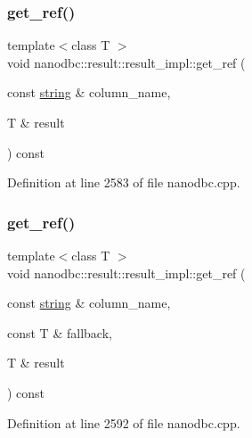 \subsubsection{\texorpdfstring{get\_ref()}{get\_ref()}\hspace{0.1cm}{\footnotesize\ttfamily [3/4]}}
{\footnotesize\ttfamily template$<$class T $>$ \\
void nanodbc\+::result\+::result\+\_\+impl\+::get\+\_\+ref (\begin{DoxyParamCaption}\item[{const \mbox{\hyperlink{namespacenanodbc_abfc0ece56278e590911ec8352774c212}{string}} \&}]{column\+\_\+name,  }\item[{T \&}]{result }\end{DoxyParamCaption}) const\hspace{0.3cm}{\ttfamily [inline]}}



Definition at line 2583 of file nanodbc.\+cpp.

\mbox{\label{classnanodbc_1_1result_1_1result__impl_a1a35ae37c9f6059277186f934b09cf12}} 
\subsubsection{\texorpdfstring{get\_ref()}{get\_ref()}\hspace{0.1cm}{\footnotesize\ttfamily [4/4]}}
{\footnotesize\ttfamily template$<$class T $>$ \\
void nanodbc\+::result\+::result\+\_\+impl\+::get\+\_\+ref (\begin{DoxyParamCaption}\item[{const \mbox{\hyperlink{namespacenanodbc_abfc0ece56278e590911ec8352774c212}{string}} \&}]{column\+\_\+name,  }\item[{const T \&}]{fallback,  }\item[{T \&}]{result }\end{DoxyParamCaption}) const\hspace{0.3cm}{\ttfamily [inline]}}



Definition at line 2592 of file nanodbc.\+cpp.

\mbox{\label{classnanodbc_1_1result_1_1result__impl_aae61bada1463697fc6a1b070c99d2be0}} 
